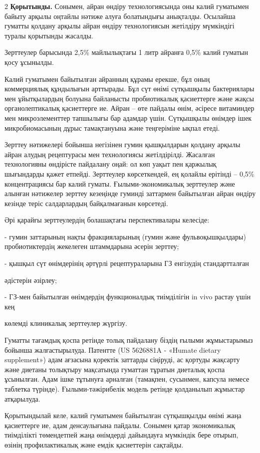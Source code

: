 \begin{multicols}{2}
{\bfseries Қорытынды.} Сонымен, айран өндіру технологиясында оны калий
гуматымен байыту арқылы оңтайлы нәтиже алуға болатындығы анықталды.
Осылайша гуматты қолдану арқылы айран өндіру технологиясын жетілдіру
мүмкіндігі туралы қорытынды жасалды.

Зерттеулер барысында 2,5\% майлылықтағы 1 литр айранға 0,5\% калий
гуматын қосу ұсынылды.

Калий гуматымен байытылған айранның құрамы ерекше, бұл оның коммерциялық
құндылығын арттырады. Бұл сүт өнімі сүтқышқылы бактериялары мен
ұйытқылардың болуына байланысты пробиотикалық қасиеттерге және жақсы
органолептикалық қасиеттерге ие. Айран -- өте пайдалы өнім, әсіресе
витаминдер мен микроэлементтер тапшылығы бар адамдар үшін. Сүтқышқылы
өнімдер ішек микробиомасының дұрыс тамақтануына және теңгеріміне ықпал
етеді.

Зерттеу нәтижелері бойынша негізінен гумин қышқылдарын қолдану арқылы
айран алудың рецептурасы мен технологиясы жетілдірілді. Жасалған
технологияны өндірісте пайдалану оңай: ол көп уақыт пен қаржылық
шығындарды қажет етпейді. Зерттеулер көрсеткендей, ең қолайлы ерітінді
-- 0,5\% концентрациясы бар калий гуматы. Ғылыми-экономикалық зерттеулер
және алынған нәтижелер зерттеу кезеңінде гуминді заттармен байытылған
айран өндіру кезінде теріс салдарлардың байқалмағанын көрсетеді.

Әрі қарайғы зерттеулердің болашақтағы перспективалары келесіде:

- гумин заттарының нақты фракцияларының (гумин және фульвоқышқылдары)
пробиотиктердің жекелеген штаммдарына әсерін зерттеу;

- қышқыл сүт өнімдерінің әртүрлі рецептураларына ГЗ енгізудің
стандартталған

әдістерін әзірлеу;

- ГЗ-мен байытылған өнімдердің функционалдық тиімділігін in vivo растау
үшін кең

көлемді клиникалық зерттеулер жүргізу.

Гуматты тағамдық қоспа ретінде толық пайдалану біздің ғылыми
жұмыстарымыз бойынша жалғастырылуда. Патентте (US 5626881A - «Humate
dietary supplement») адам ағзасына қоректік заттарды сіңіруді, ас
қортуды жақсарту және диетаны толықтыру мақсатында гуматтан тұратын
диеталық қоспа ұсынылған. Адам ішке тұтынуға арналған (тамақпен,
сусынмен, капсула немесе таблетка түрінде). Ғылыми-тәжірибелік модель
ретінде қолданылып жұмыстар атқарылуда.

Қорытындылай келе, калий гуматымен байытылған сүтқышқылды өнімі жаңа
қасиеттерге ие, адам денсаулығына пайдалы. Сонымен қатар экономикалық
тиімділікті төмендетпей жаңа өнімдерді дайындауға мүмкіндік бере отырып,
өзінің профилактикалық және емдік қасиеттерін сақтайды.
\end{multicols}

